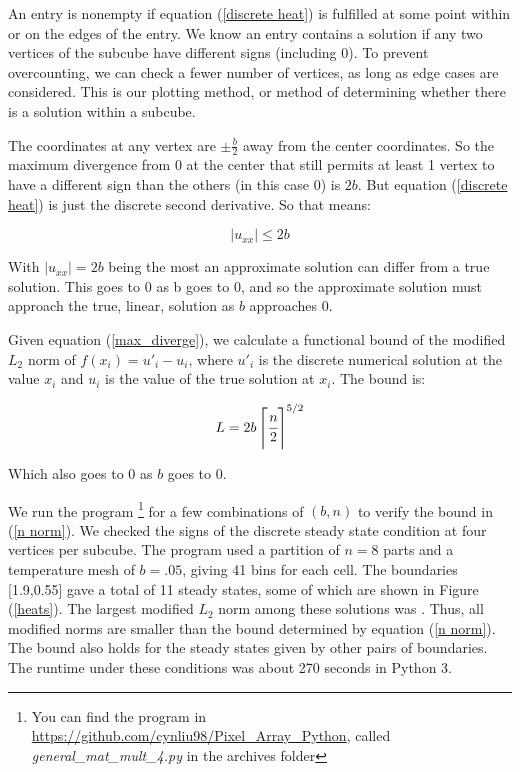 \documentclass{article}
\begin{document}
An entry is nonempty if equation (\ref{discrete heat}) is fulfilled at some point within or on the edges of the entry. We know an entry contains a solution if any two vertices of the subcube have different signs (including 0). To prevent overcounting, we can check a fewer number of vertices, as long as edge cases are considered. This is our plotting method, or method of determining whether there is a solution within a subcube.

The coordinates at any vertex are $\pm \frac{b}{2}$ away from the center coordinates. So the maximum divergence from 0 at the center that still permits at least 1 vertex to have a different sign than the others (in this case 0) is $2b$. But equation (\ref{discrete heat}) is just the discrete second derivative. So that means:

\begin{equation}
    \label{max_diverge}
    |u_{xx}| \le 2b
\end{equation}

\noindent With $|u_{xx}| = 2b$ being the most an approximate solution can differ from a true solution. This goes to 0 as b goes to 0, and so the approximate solution must approach the true, linear, solution as $b$ approaches 0.

Given equation (\ref{max_diverge}), we calculate a functional bound of the modified $L_2$ norm of $f(x_i) = u'_i-u_i$, where $u'_i$ is the discrete numerical solution at the value $x_i$ and $u_i$ is the value of the true solution at $x_i$. The bound is:

\begin{equation}
\label{n norm}
L = 2b \left \lceil \cfrac{n}{2} \right \rceil^{5/2}
\end{equation}

\noindent Which also goes to 0 as $b$ goes to 0. 

We run the program \footnote{You can find the program in \url{https://github.com/cynliu98/Pixel\_Array\_Python}, called \textit{general\_mat\_mult\_4.py} in the archives folder} for a few combinations of $(b,n)$ to verify the bound in (\ref{n norm}). We checked the signs of the discrete steady state condition at four vertices per subcube. The program used a partition of $n=8$ parts and a temperature mesh of $b = .05$, giving 41 bins for each cell. The boundaries [1.9,0.55] gave a total of 11 steady states, some of which are shown in Figure (\ref{heats}). The largest modified $L_2$ norm among these solutions was . Thus, all modified norms are smaller than the bound determined by equation (\ref{n norm}). The bound also holds for the steady states given by other pairs of boundaries. The runtime under these conditions was about 270 seconds in Python 3.
\end{document}
